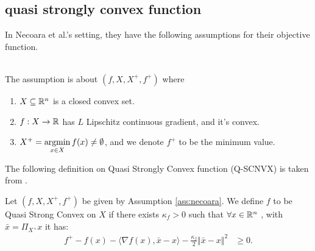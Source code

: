 \documentclass[12pt]{article}
\begin{document}
    \subsection{quasi strongly convex function}
        In Necoara et al.'s setting, they have the following assumptions for their objective function. 
        \begin{assumption}\;\label{ass:necoara}\\
            The assumption is about $(f, X, X^+, f^+)$ where 
            \begin{enumerate}[nosep]
                \item $X \subseteq \mathbb R^n$ is a closed convex set. 
                \item $f: X\rightarrow \mathbb R$ has $L$ Lipschitz continuous gradient, and it's convex. 
                \item $X^+ = \mathop{\rm argmin}\limits_{x \in X} f(x)\neq \emptyset$, and we denote $f^+$ to be the minimum value. 
            \end{enumerate}
        \end{assumption}
        The following definition on Quasi Strongly Convex function (Q-SCNVX) is taken from \cite[Definition 1]{necoara_linear_2019}. 
        \begin{definition}[Q-SCNVX]\label{def:Q-SCNVX}
            Let $(f, X, X^+, f^+)$ be given by Assumption \ref{ass:necoara}. 
            We define $f$ to be Quasi Strong Convex on $X$ if there exists $\kappa_f  > 0$ such that $\forall x \in \mathbb R^n$ , with $\bar x = \Pi_{X^+}x$ it has:
            \begin{align*}
                f^+ - f(x) - \langle \nabla f(x), \bar x - x\rangle - \frac{\kappa_f}{2}\Vert \bar x - x\Vert^2 
                &\ge 0. 
            \end{align*}
        \end{definition}
        
\end{document}
